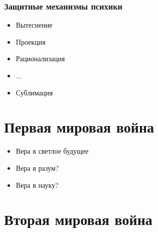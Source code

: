 \documentclass[aspectratio=169]{beamer}
\begin{document}
\begin{bframe}\frametitle{Защитные механизмы психики}
\begin{itemize}
\item<+-> Вытеснение
\item<+-> Проекция
\item<+-> Рационализация
\item<+-> ...
\item<+-> Сублимация
\end{itemize}

\end{bframe}

\section{Первая мировая война}

\begin{bframe}
\begin{itemize}
\item<+-> Вера в светлое будущее
\item<+-> Вера в разум?
\item<+-> Вера в науку?
\end{itemize}
\end{bframe}

\section{Вторая мировая война}
\end{document}
